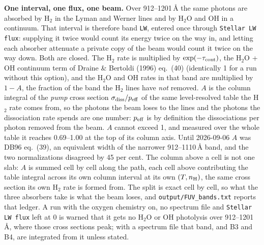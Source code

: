 \documentclass[english,a4paper]{my_memo}
\begin{document}
\textbf{One interval, one flux, one beam.} Over 912--1201\,\AA{} the same
photons are absorbed by H$_2$ in the Lyman and Werner lines and by H$_2$O and
OH in a continuum. That interval is therefore band \texttt{LW}, entered once
through \texttt{Stellar LW flux}: supplying it twice would count its energy
twice on the way in, and letting each absorber attenuate a private copy of the
beam would count it twice on the way down. Both are closed. The H$_2$ rate is
multiplied by $\exp(-\tau_{\rm cont})$, the H$_2$O + OH continuum term of
Draine \& Bertoldi (1996) eq.~(40) (identically 1 for a run without this
option), and the H$_2$O and OH rates in that band are multiplied by $1-A$,
the fraction of the band the H$_2$ lines have \emph{not} removed. $A$ is the
column integral of the \emph{pump} cross section
$\sigma_{\rm diss}/p_{\rm eff}$ of the same level-resolved table the H$_2$
rate comes from, so the photons the beam loses to the lines and the photons
the dissociation rate spends are one number: $p_{\rm eff}$ is by definition
the dissociations per photon removed from the beam. $A$ cannot exceed 1, and
measured over the whole table it reaches 0.69--1.00 at the top of its column
axis. Until 2026-09-06 $A$ was DB96 eq.~(39), an equivalent width of the
narrower 912--1110\,\AA{} band, and the two normalizations disagreed by 45 per
cent. The column above a cell is not one slab: $A$ is summed cell by cell along
the path, each cell above contributing the table integral across its own
column interval at its own $(T,n_{\rm H})$, the same cross section its own
H$_2$ rate is formed from. The split is exact cell by cell, so what the three absorbers take is
what the beam loses, and \texttt{output/FUV\_bands.txt} reports that ledger.
A run with the oxygen chemistry on, no spectrum file and
\texttt{Stellar LW flux} left at 0 is warned that it gets no H$_2$O or OH
photolysis over 912--1201\,\AA, where those cross sections peak; with a
spectrum file that band, and B3 and B4, are integrated from it unless stated.
\end{document}
